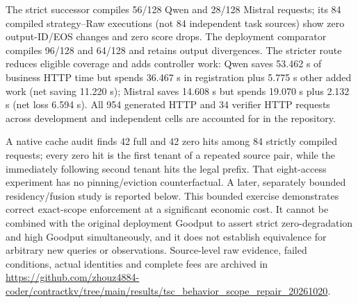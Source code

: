 The strict successor compiles 56/128 Qwen and 28/128 Mistral requests; its 84 compiled strategy--Raw executions (not 84 independent task sources) show zero output-ID/EOS changes and zero score drops. The deployment comparator compiles 96/128 and 64/128 and retains output divergences. The stricter route reduces eligible coverage and adds controller work: Qwen saves 53.462 s of business HTTP time but spends 36.467 s in registration plus 5.775 s other added work (net saving 11.220 s); Mistral saves 14.608 s but spends 19.070 s plus 2.132 s (net loss 6.594 s). All 954 generated HTTP and 34 verifier HTTP requests across development and independent cells are accounted for in the repository.

A native cache audit finds 42 full and 42 zero hits among 84 strictly compiled requests; every zero hit is the first tenant of a repeated source pair, while the immediately following second tenant hits the legal prefix. That eight-access experiment has no pinning/eviction counterfactual. A later, separately bounded residency/fusion study is reported below. This bounded exercise demonstrates correct exact-scope enforcement at a significant economic cost. It cannot be combined with the original deployment Goodput to assert strict zero-degradation and high Goodput simultaneously, and it does not establish equivalence for arbitrary new queries or observations. Source-level raw evidence, failed conditions, actual identities and complete fees are archived in \url{https://github.com/zhouz4884-coder/contractkv/tree/main/results/tsc_behavior_scope_repair_20261020}.

